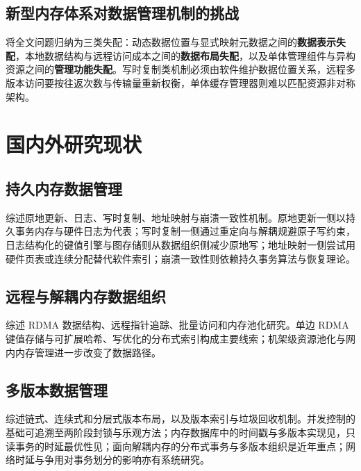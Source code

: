 \subsection{新型内存体系对数据管理机制的挑战}
将全文问题归纳为三类失配：动态数据位置与显式映射元数据之间的\textbf{数据表示失配}，本地数据结构与远程访问成本之间的\textbf{数据布局失配}，以及单体管理组件与异构资源之间的\textbf{管理功能失配}。写时复制类机制必须由软件维护数据位置关系\cite{liuDudetm2017,marmolLibpm2018,liCtfs2022}，远程多版本访问要按往返次数与传输量重新权衡\cite{zhangMotor2024,binnigEnd2016}，单体缓存管理器则难以匹配资源非对称架构\cite{caoPolardb2021,zhangTowards2021}。

\section{国内外研究现状}
\subsection{持久内存数据管理}
综述原地更新、日志、写时复制、地址映射与崩溃一致性机制。原地更新一侧以持久事务内存与硬件日志为代表\cite{herlihyTransactional1993,wuArchtm2021,gencCrafty2020,castroSpht2021,krishnanDurable2020,zhangSilo2023,guPisces2019,yeSpecpmt2023}；写时复制一侧通过重定向与解耦规避原子写约束\cite{liuDudetm2017,caiHoop2020,niSsp2019,bhattacharyyaNvmr2022}，日志结构化的键值引擎与图存储则从数据组织侧减少原地写\cite{chenFlatstore2020,wangXpgraph2022}；地址映射一侧尝试用硬件页表或连续分配替代软件索引\cite{marmolLibpm2018,liCtfs2022,kadekodiWinefs2021,mathurNew2007}；崩溃一致性则依赖持久事务算法与恢复理论\cite{correiaRomulus2018,assaTl4x2023,chakrabartiAtlas2014,bernsteinConcurrency1987}。
\subsection{远程与解耦内存数据组织}
综述 RDMA 数据结构、远程指针追踪、批量访问和内存池化研究。单边 RDMA 键值存储与可扩展哈希\cite{mitchellUsing2013,zuoOne2021}、写优化的分布式索引\cite{wangSherman2022,anMarlin2023,luoSmart2023,liRolex2023,luDex2024,minSephash2024,wangOptimizing2024}构成主要线索；机架级资源池化与网内内存管理进一步改变了数据路径\cite{katrinisRack2016,leeMind2021}。
\subsection{多版本数据管理}
综述链式、连续式和分层式版本布局，以及版本索引与垃圾回收机制。并发控制的基础可追溯至两阶段封锁与乐观方法\cite{bernsteinConcurrency1987,kungOn1981}；内存数据库中的时间戳与多版本实现见\cite{tuSpeedy2013,weiUnifying2021}，只读事务的时延最优性见\cite{luSnow2016}；面向解耦内存的分布式事务与多版本组织是近年重点\cite{chenFast2016,dragojevicFarm2014,shamisFast2019,schuhXenic2021,jiangAurogon2022,zhangFord2022,luScythe2024,zhangMotor2024}；网络时延与争用对事务划分的影响亦有系统研究\cite{binnigEnd2016,zamanianEnd2017,zamanianChiller2020,dingCentiman2015,guoReleasing2021,weiCharacterizing2021}。
